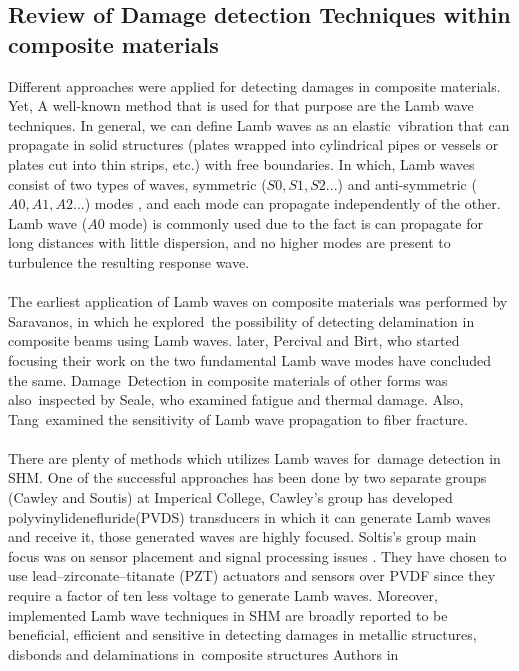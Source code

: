 \documentclass[preprint,12pt]{elsarticle}
\begin{document}
	
	
	\subsection{Review of Damage detection Techniques within composite materials }	
	Different approaches were applied for detecting damages in composite materials. Yet, A well-known method that is used for that purpose are the Lamb wave techniques. In general, we can define Lamb waves as an elastic vibration that can propagate in solid structures (plates wrapped into cylindrical pipes or vessels or plates cut into thin strips, etc.) with free boundaries. In which, Lamb waves consist of two types of waves, symmetric ($S0,S1,S2...$) and anti-symmetric ($A0,A1,A2...$) modes , and each mode can propagate independently of the other. Lamb wave ($A0$ mode) is commonly used due to the fact is can propagate for long distances with little dispersion, and no higher modes are present to turbulence the resulting response wave\cite{Valed2000}.
	\paragraph{}
	
	The earliest application of Lamb waves on composite materials was performed by Saravanos, in which he explored the possibility of detecting delamination in composite beams using Lamb waves\cite{doi:10.2514/6.1994-1754}. later, Percival and Birt, who started focusing their work on the two fundamental Lamb wave modes have concluded the same\cite{Percival1997}. Damage Detection in composite materials of other forms was also inspected by Seale, who examined fatigue and thermal damage\cite{Seale1998}. Also, Tang examined the sensitivity of Lamb wave propagation to fiber fracture\cite{Tang1989}.
	\paragraph{}
	
	There are plenty of methods which utilizes Lamb waves for damage detection in SHM. One of the successful approaches has been done by two separate groups (Cawley and Soutis) at Imperical College, Cawley's group has developed polyvinylidenefluride(PVDS) transducers in which it can generate Lamb waves and receive it, those generated waves are highly focused. Soltis's group main focus was on sensor placement and signal processing issues \cite{Valed2000,Valed2000a,Valed2001}. They have chosen to use lead–zirconate–titanate (PZT) actuators and sensors over PVDF since they require a factor of ten less voltage to generate Lamb waves. Moreover, implemented Lamb wave techniques in SHM are broadly reported to be beneficial, efficient and sensitive in detecting damages in metallic structures, disbonds and delaminations in composite structures\cite{Boller2000,Diamanti2004,Su2006,Raghavan2007,Diamanti2007} \newline Authors in\cite{Ng2009} 
	  
\end{document}
